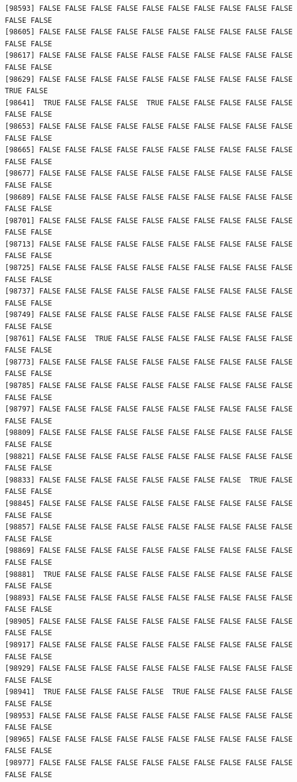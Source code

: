 \documentclass[
  a4paper,
  DIV=11,
  numbers=noendperiod]{scrartcl}
\begin{document}
\begin{verbatim}
[98593] FALSE FALSE FALSE FALSE FALSE FALSE FALSE FALSE FALSE FALSE FALSE FALSE
[98605] FALSE FALSE FALSE FALSE FALSE FALSE FALSE FALSE FALSE FALSE FALSE FALSE
[98617] FALSE FALSE FALSE FALSE FALSE FALSE FALSE FALSE FALSE FALSE FALSE FALSE
[98629] FALSE FALSE FALSE FALSE FALSE FALSE FALSE FALSE FALSE FALSE  TRUE FALSE
[98641]  TRUE FALSE FALSE FALSE  TRUE FALSE FALSE FALSE FALSE FALSE FALSE FALSE
[98653] FALSE FALSE FALSE FALSE FALSE FALSE FALSE FALSE FALSE FALSE FALSE FALSE
[98665] FALSE FALSE FALSE FALSE FALSE FALSE FALSE FALSE FALSE FALSE FALSE FALSE
[98677] FALSE FALSE FALSE FALSE FALSE FALSE FALSE FALSE FALSE FALSE FALSE FALSE
[98689] FALSE FALSE FALSE FALSE FALSE FALSE FALSE FALSE FALSE FALSE FALSE FALSE
[98701] FALSE FALSE FALSE FALSE FALSE FALSE FALSE FALSE FALSE FALSE FALSE FALSE
[98713] FALSE FALSE FALSE FALSE FALSE FALSE FALSE FALSE FALSE FALSE FALSE FALSE
[98725] FALSE FALSE FALSE FALSE FALSE FALSE FALSE FALSE FALSE FALSE FALSE FALSE
[98737] FALSE FALSE FALSE FALSE FALSE FALSE FALSE FALSE FALSE FALSE FALSE FALSE
[98749] FALSE FALSE FALSE FALSE FALSE FALSE FALSE FALSE FALSE FALSE FALSE FALSE
[98761] FALSE FALSE  TRUE FALSE FALSE FALSE FALSE FALSE FALSE FALSE FALSE FALSE
[98773] FALSE FALSE FALSE FALSE FALSE FALSE FALSE FALSE FALSE FALSE FALSE FALSE
[98785] FALSE FALSE FALSE FALSE FALSE FALSE FALSE FALSE FALSE FALSE FALSE FALSE
[98797] FALSE FALSE FALSE FALSE FALSE FALSE FALSE FALSE FALSE FALSE FALSE FALSE
[98809] FALSE FALSE FALSE FALSE FALSE FALSE FALSE FALSE FALSE FALSE FALSE FALSE
[98821] FALSE FALSE FALSE FALSE FALSE FALSE FALSE FALSE FALSE FALSE FALSE FALSE
[98833] FALSE FALSE FALSE FALSE FALSE FALSE FALSE FALSE  TRUE FALSE FALSE FALSE
[98845] FALSE FALSE FALSE FALSE FALSE FALSE FALSE FALSE FALSE FALSE FALSE FALSE
[98857] FALSE FALSE FALSE FALSE FALSE FALSE FALSE FALSE FALSE FALSE FALSE FALSE
[98869] FALSE FALSE FALSE FALSE FALSE FALSE FALSE FALSE FALSE FALSE FALSE FALSE
[98881]  TRUE FALSE FALSE FALSE FALSE FALSE FALSE FALSE FALSE FALSE FALSE FALSE
[98893] FALSE FALSE FALSE FALSE FALSE FALSE FALSE FALSE FALSE FALSE FALSE FALSE
[98905] FALSE FALSE FALSE FALSE FALSE FALSE FALSE FALSE FALSE FALSE FALSE FALSE
[98917] FALSE FALSE FALSE FALSE FALSE FALSE FALSE FALSE FALSE FALSE FALSE FALSE
[98929] FALSE FALSE FALSE FALSE FALSE FALSE FALSE FALSE FALSE FALSE FALSE FALSE
[98941]  TRUE FALSE FALSE FALSE FALSE  TRUE FALSE FALSE FALSE FALSE FALSE FALSE
[98953] FALSE FALSE FALSE FALSE FALSE FALSE FALSE FALSE FALSE FALSE FALSE FALSE
[98965] FALSE FALSE FALSE FALSE FALSE FALSE FALSE FALSE FALSE FALSE FALSE FALSE
[98977] FALSE FALSE FALSE FALSE FALSE FALSE FALSE FALSE FALSE FALSE FALSE FALSE

\end{verbatim}
\end{document}
